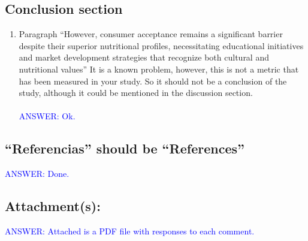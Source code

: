 \documentclass{article}
\begin{document}
\subsection{Conclusion section}

\begin{enumerate}
    \item Paragraph “However, consumer acceptance remains a significant barrier despite their superior nutritional profiles, necessitating educational initiatives and market development strategies that recognize both cultural and nutritional values” It is a known problem, however, this is not a metric that has been measured in your study. So it should not be a conclusion of the study, although it could be mentioned in the discussion section.\\\\
    \textcolor{blue}{ANSWER: Ok.}
\end{enumerate}


\subsection{“Referencias” should be “References”}
    \textcolor{blue}{ANSWER: Done.}



\subsection{Attachment(s):}
    \textcolor{blue}{ANSWER: Attached is a PDF file with responses to each comment.}
\end{document}
